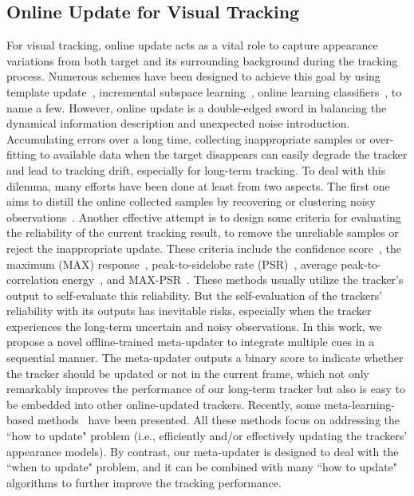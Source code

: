 \documentclass[10pt,twocolumn,letterpaper]{article}
\begin{document}
\vspace{-1mm}
\subsection{Online Update for Visual Tracking}
\vspace{-2mm}
\label{sec2-2}
For visual tracking, online update acts as a vital role to capture appearance variations
from both target and its surrounding background during the tracking process.
Numerous schemes have been designed to achieve this goal by using template update~\cite{KOT,DSiam,GradNet},
incremental subspace learning~\cite{IVT,OSPT},
online learning classifiers~\cite{KCF,Nam-CVPR16-MDNet,Danelljan-CVPR17-ECO,Danelljan-CVPR19-ATOM},
to name a few.
However, online update is a double-edged sword in balancing the dynamical information
description and unexpected noise introduction.
Accumulating errors over a long time, collecting inappropriate samples or over-fitting to available
data when the target disappears can easily degrade the tracker and lead to tracking drift, especially
for long-term tracking.
To deal with this dilemma, many efforts have been done at least from two aspects.
The first one aims to distill the online collected samples by recovering or clustering noisy observations~\cite{OSPT,Danelljan-CVPR17-ECO}.
Another effective attempt is to design some criteria for evaluating the reliability of the current tracking
result, to remove the unreliable samples or reject the inappropriate update.
These criteria include the confidence score~\cite{Nam-CVPR16-MDNet},
the maximum (MAX) response~\cite{Danelljan-CVPR19-ATOM}, peak-to-sidelobe rate
(PSR)~\cite{Danelljan-CVPR19-ATOM},
average peak-to-correlation energy~\cite{LMCF}, and MAX-PSR~\cite{FCLT}.
These methods usually utilize the tracker's output to self-evaluate this reliability. But the self-evaluation
of the trackers' reliability with its outputs has inevitable risks, especially when the tracker experiences
the long-term uncertain and noisy observations.
In this work, we propose a novel offline-trained meta-updater to integrate multiple cues in a sequential manner.
The meta-updater outputs a binary score to indicate whether the tracker should be updated or not in the current frame,
which not only remarkably improves the performance of our long-term tracker but also is easy to be embedded
into other online-updated trackers.
Recently, some meta-learning-based methods~\cite{Lee-ECCVW18-MMLT,Park-ECCV18-Meta-tracker,Li-TIP19-RML,Huang-AAAI2019,Park-ICCV19-DML,GradNet} have been presented.
All these methods focus on addressing the ``how to update" problem (i.e., efficiently and/or effectively
updating the trackers' appearance models).
By contrast, our meta-updater is designed to deal with the ``when to update" problem, and it can be
combined with many ``how to update" algorithms to further improve the tracking performance.
\end{document}
